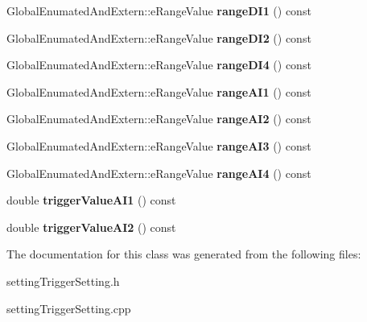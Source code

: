 \begin{DoxyCompactItemize}
\item 
\mbox{\label{class_setting_trigger_setting_a2a48c14280cf175568de4787fbb75e70}} 
Global\+Enumated\+And\+Extern\+::e\+Range\+Value {\bfseries range\+D\+I1} () const
\item 
\mbox{\label{class_setting_trigger_setting_a1b58f153e72014ae707c2ee08d1a99c9}} 
Global\+Enumated\+And\+Extern\+::e\+Range\+Value {\bfseries range\+D\+I2} () const
\item 
\mbox{\label{class_setting_trigger_setting_a9d0fe62d93653be849611ea478f14066}} 
Global\+Enumated\+And\+Extern\+::e\+Range\+Value {\bfseries range\+D\+I4} () const
\item 
\mbox{\label{class_setting_trigger_setting_acad35b03d4f66196c4cad14310987d87}} 
Global\+Enumated\+And\+Extern\+::e\+Range\+Value {\bfseries range\+A\+I1} () const
\item 
\mbox{\label{class_setting_trigger_setting_aa7ce558380f2018189dfa4aa9c4afb20}} 
Global\+Enumated\+And\+Extern\+::e\+Range\+Value {\bfseries range\+A\+I2} () const
\item 
\mbox{\label{class_setting_trigger_setting_a10faff909bf3313222cf16339e7c3170}} 
Global\+Enumated\+And\+Extern\+::e\+Range\+Value {\bfseries range\+A\+I3} () const
\item 
\mbox{\label{class_setting_trigger_setting_aec6471d8c3b43b79fa6dc1c8b531f153}} 
Global\+Enumated\+And\+Extern\+::e\+Range\+Value {\bfseries range\+A\+I4} () const
\item 
\mbox{\label{class_setting_trigger_setting_afa790ff48a2e4a549e2f62dacc6c64f8}} 
double {\bfseries trigger\+Value\+A\+I1} () const
\item 
\mbox{\label{class_setting_trigger_setting_a5ff613ab85105fb6809d1358514389f4}} 
double {\bfseries trigger\+Value\+A\+I2} () const
\end{DoxyCompactItemize}


The documentation for this class was generated from the following files\+:\begin{DoxyCompactItemize}
\item 
setting\+Trigger\+Setting.\+h\item 
setting\+Trigger\+Setting.\+cpp\end{DoxyCompactItemize}
